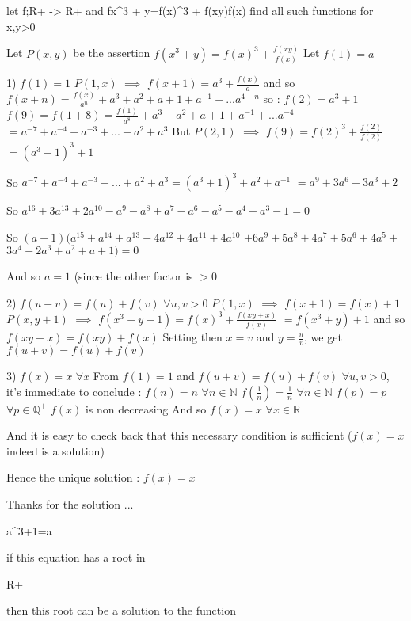 \begin{solution}
	\begin{tcolorbox}let f;R+ -> R+  and f{x^3 + y}={f(x)}^3 + {f(xy)}\/{f(x)} find all such functions for x,y>0\end{tcolorbox}
Let $ P(x,y)$ be the assertion $ f(x^3+y)=f(x)^3+\frac{f(xy)}{f(x)}$
Let $ f(1)=a$


1) $ f(1)=1$
$ P(1,x)$ $ \implies$ $ f(x+1)=a^3+\frac{f(x)}a$ and so $ f(x+n)=\frac{f(x)}{a^n}+a^3+a^2+a+1+a^{-1}+...a^{4-n}$ so :
$ f(2)=a^3+1$
$ f(9)=f(1+8)=\frac{f(1)}{a^8}+a^3+a^2+a+1+a^{-1}+...a^{-4}$ $ =a^{-7}+a^{-4}+a^{-3}+...+a^2+a^3$
But $ P(2,1)$ $ \implies$ $ f(9)=f(2)^3+\frac{f(2)}{f(2)}$ $ =(a^3+1)^3+1$

So $ a^{-7}+a^{-4}+a^{-3}+...+a^2+a^3=(a^3+1)^3+a^2+a^{-1}$ $ =a^9+3a^6+3a^3+2$

So $ a^{16}+3a^{13}+2a^{10}-a^9-a^8+a^7-a^6-a^5-a^4-a^3-1=0$

So $ (a-1)(a^{15}+a^{14}+a^{13}+4a^{12}+4a^{11}+4a^{10}$ $ +6a^9+5a^8+4a^7+5a^6+4a^5+$ $ 3a^4+2a^3+a^2+a+1)=0$

And so $ a=1$ (since the other factor is $ >0$

2) $ f(u+v)=f(u)+f(v)$ $ \forall u,v>0$
$ P(1,x)$ $ \implies$ $ f(x+1)=f(x)+1$
$ P(x,y+1)$ $ \implies$ $ f(x^3+y+1)=f(x)^3+\frac{f(xy+x)}{f(x)}$ $ =f(x^3+y)+1$ and so $ f(xy+x)=f(xy)+f(x)$
Setting then $ x=v$ and $ y=\frac uv$, we get $ f(u+v)=f(u)+f(v)$

3) $ f(x)=x$ $ \forall x$
From $ f(1)=1$ and $ f(u+v)=f(u)+f(v)$ $ \forall u,v>0$, it's immediate to conclude :
$ f(n)=n$ $ \forall n\in\mathbb N$
$ f(\frac 1n)=\frac 1n$ $ \forall n\in\mathbb N$
$ f(p)=p$ $ \forall p\in\mathbb Q^+$
$ f(x)$ is non decreasing
And so $ f(x)=x$ $ \forall x\in\mathbb R^+$

And it is easy to check back that this necessary condition is sufficient ($ f(x)=x$ indeed is a solution)

Hence the unique solution : $ \boxed{f(x)=x}$
\end{solution}



\begin{solution}
	Thanks for the solution ... 
\begin{bolded}a^{3}+1=a \end{bolded} if this equation has a root in \begin{bolded}{R+} \end{bolded} then this root can be a solution to the function
\end{solution}



